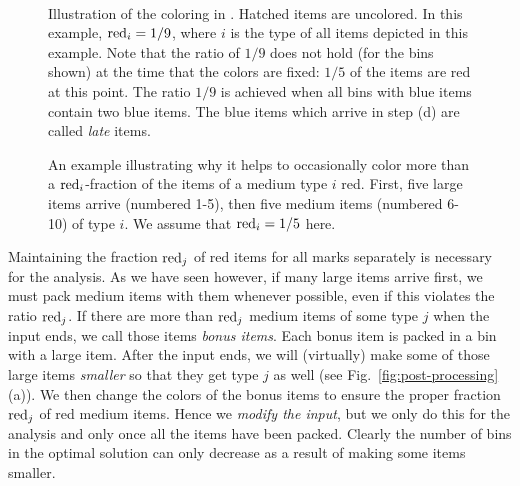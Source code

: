 \begin{figure}
	\begin{center}
		\hspace{7mm}
		\\
		\hspace{7mm}
	\end{center}
	\caption{\label{illus}Illustration of the coloring in \EHarm{}. Hatched items are uncolored. In this example, $\mathrm{red}_i=1/9$, where $i$ is the type of all items depicted in this example.
		Note that the ratio of $1/9$ does not hold (for the bins shown)
		at the time that the colors are fixed: $1/5$ of the items are red at this point.
		The ratio $1/9$ is achieved when all bins with blue items contain two blue items.
		The blue items which arrive in step (d) are called \emph{late} items.}
\end{figure}

\begin{figure}
	\centering
	\hspace{7mm}
	\caption{An example illustrating why it helps to occasionally color more than a $\mathrm{red}_i$-fraction of the items of a medium type $i$ red. First, five large items arrive (numbered 1-5), then five medium items (numbered 6-10) of type $i$. We assume that $\mathrm{red}_i=1/5$ here. \label{fig:all-medium-red}}
\end{figure}


Maintaining the fraction $\mathrm{red}_j$ of red items for all marks separately is necessary for the analysis. 
As we have seen however, if many large items arrive first, we must pack medium items with them whenever possible,
even if this violates the ratio $\mathrm{red}_j$. 
If there are more than $\mathrm{red}_j$ medium items of some type $j$ when the input ends,
we call those items \emph{bonus items}. Each bonus item is packed in a bin with a large item.
After the input ends, we will (virtually) make some of those large items \emph{smaller} so that they get 
type $j$ as well (see Fig.~\ref{fig:post-processing}(a)).
We then change the colors of the bonus items to ensure the proper fraction
$\mathrm{red}_j$ of red medium items.
Hence we \emph{modify the input}, but we only do this for the analysis and only once all the items have been packed.
Clearly the number of bins in the optimal solution can only decrease as a result of making some items smaller.

